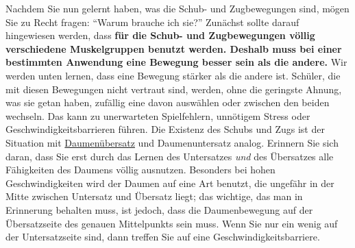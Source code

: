 Nachdem Sie nun gelernt haben, was die Schub- und Zugbewegungen sind, mögen Sie zu Recht fragen: \enquote{Warum brauche ich sie?}
Zunächst sollte darauf hingewiesen werden, dass \textbf{für die Schub- und Zugbewegungen völlig verschiedene Muskelgruppen benutzt werden.
Deshalb muss bei einer bestimmten Anwendung eine Bewegung besser sein als die andere.}
Wir werden unten lernen, dass eine Bewegung stärker als die andere ist.
Schüler, die mit diesen Bewegungen nicht vertraut sind, werden, ohne die geringste Ahnung, was sie getan haben, zufällig eine davon auswählen oder zwischen den beiden wechseln.
Das kann zu unerwarteten Spielfehlern, unnötigem Stress oder Geschwindigkeitsbarrieren führen.
Die Existenz des Schubs und Zugs ist der Situation mit \hyperref[c1iii5b]{Daumenübersatz} und Daumenuntersatz analog.
Erinnern Sie sich daran, dass Sie erst durch das Lernen des Untersatzes \textit{und} des Übersatzes alle Fähigkeiten des Daumens völlig ausnutzen.
Besonders bei hohen Geschwindigkeiten wird der Daumen auf eine Art benutzt, die ungefähr in der Mitte zwischen Untersatz und Übersatz liegt; das wichtige, das man in Erinnerung behalten muss, ist jedoch, dass die Daumenbewegung auf der Übersatzseite des genauen Mittelpunkts sein muss.
Wenn Sie nur ein wenig auf der Untersatzseite sind, dann treffen Sie auf eine Geschwindigkeitsbarriere.

